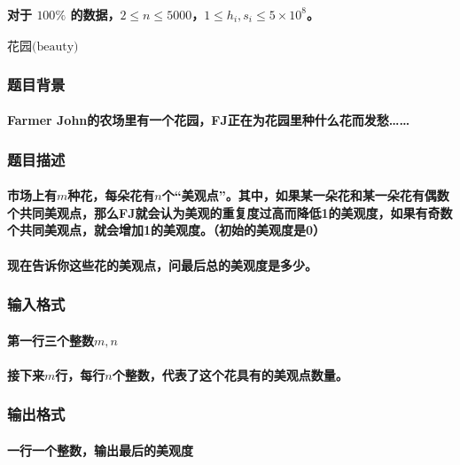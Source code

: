 \documentclass[final,11pt,oneside,UTF8]{report}
\begin{document}
\paragraph{
    对于 $100\%$ 的数据，$2\le n\le 5000$，$1\le h_i,s_i\le 5\times 10^8$。
}
\newpage
\centerline{\LARGE{$\textbf{花园}\text{(beauty)}$}}
\subsubsection{题目背景}
\paragraph{
    Farmer John的农场里有一个花园，FJ正在为花园里种什么花而发愁……
}
\subsubsection{题目描述}
\paragraph{
    市场上有$m$种花，每朵花有$n$个“美观点”。其中，如果某一朵花和某一朵花有偶数个共同美观点，那么FJ就会认为美观的重复度过高而降低1的美观度，如果有奇数个共同美观点，就会增加1的美观度。（初始的美观度是0）
}
\paragraph{
    现在告诉你这些花的美观点，问最后总的美观度是多少。
}
\subsubsection{输入格式}
\paragraph{第一行三个整数$m,n$}
\paragraph{接下来$m$行，每行$n$个整数，代表了这个花具有的美观点数量。}
\subsubsection{输出格式}
\paragraph{
    一行一个整数，输出最后的美观度
}
\end{document}
